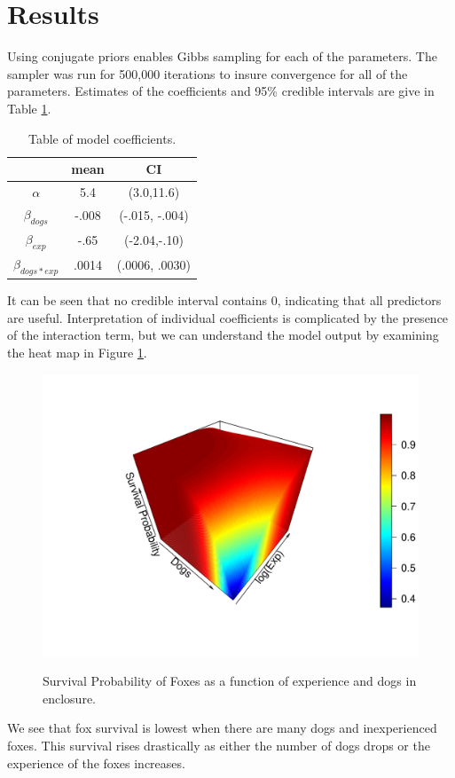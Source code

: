 \documentclass[aoas,preprint]{imsart}
\numberwithin{equation}{section}
\theoremstyle{plain}
\begin{document}
\section{Results}
Using conjugate priors enables Gibbs sampling for each of the parameters. The sampler was run for 500,000 iterations to insure convergence for all of the parameters. Estimates of the coefficients and 95\% credible intervals are give in Table \ref{tab:PostEst}. 
\begin{table}[h!]
	\begin{center}
		\begin{tabular}{|c|c|c|}
			\hline
			& mean & CI \\
			\hline
			$\alpha$ & 5.4 & (3.0,11.6) \\
			$\beta_{dogs}$ & -.008 & (-.015, -.004) \\
			$\beta_{exp}$ & -.65 & (-2.04,-.10) \\
			$\beta_{dogs*exp}$ & .0014 & (.0006, .0030)\\
			\hline
		\end{tabular}
		\label{tab:PostEst}
	\end{center}
	\caption{Table of model coefficients.}
\end{table}
It can be seen that no credible interval contains 0, indicating that all predictors are useful. Interpretation of individual coefficients is complicated by the presence of the interaction term, but we can understand the model output by examining the heat map in Figure \ref{fig:SurvProb2}. 
\begin{figure}[h!]
\begin{center}
\caption{Survival Probability of Foxes as a function of experience and dogs in enclosure.}
\includegraphics[width=.7\textwidth]{survivalprob.pdf}
\label{fig:SurvProb2}
\end{center}
\end{figure}
We see that fox survival is lowest when there are many dogs and inexperienced foxes. This survival rises drastically as either the number of dogs drops or the experience of the foxes increases.
\end{document}
